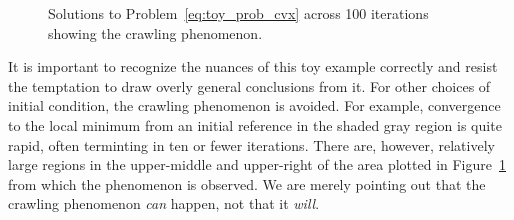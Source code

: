 \documentclass[letterpaper, 10 pt, conference]{ieeeconf}
\begin{document}
\begin{figure}
\centering
{} 
\caption{Solutions to Problem~\eqref{eq:toy_prob_cvx} across 100 iterations showing the crawling phenomenon.}
\label{fig:toy_prob_soln}
\end{figure}


It is important to recognize the nuances of this toy example correctly and resist the temptation to draw overly general conclusions from it. For other choices of initial condition, the crawling phenomenon is avoided. For example, convergence to the local minimum from an initial reference in the shaded gray region is quite rapid, often terminting in ten or fewer iterations. There are, however, relatively large regions in the upper-middle and upper-right of the area plotted in Figure~\ref{fig:toy_prob_soln} from which the phenomenon is observed. We are merely pointing out that the crawling phenomenon \textit{can} happen, not that it \textit{will}. 
\end{document}
